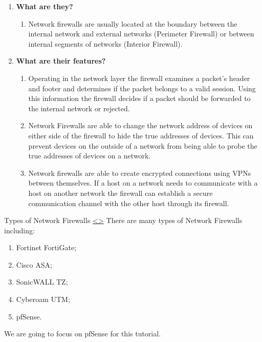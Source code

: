 \documentclass[12pt]{extarticle}
\newenvironment{instructionblock}{\Large\bgroup}{\egroup}
\newcommand{\ben}{\begin{enumerate}}
\newcommand{\een}{\end{enumerate}}
\begin{document}
\vspace{8mm}
\ben

\item \textbf{What are they?}
\begin{enumerate}
\item Network firewalls are usually located at the boundary between the internal network and external networks (Perimeter Firewall) or between internal segments of networks (Interior Firewall).
\end{enumerate}
\item \textbf{What are their features?}
\begin{enumerate}
\item Operating in the network layer the firewall examines a packet's header and footer and determines if the packet belongs to a valid session. Using this information the firewall decides if a packet should be forwarded to the internal network or rejected.\cite{Zen2017PacketInsp}
\item Network Firewalls are able to change the network address of devices on either side of the firewall to hide the true addresses of devices. This can prevent devices on the outside of a network from being able to probe the true addresses of devices on a network.\cite{UnivHOU2016Firewalls}
\item Network firewalls are able to create encrypted connections using VPNs between themselves. If a host on a network needs to communicate with a host on another network the firewall can establish a secure communication channel with the other host through its firewall.
\end{enumerate}

\een







\pagebreak
\begin{slide}{ Types of Network Firewalls }{ \hyperref[slide 5]{\textless}\hyperref[slide 7]{\textgreater} }
\vskip 5pt
\begin{instructionblock}
There are many types of Network Firewalls including: 
\begin{enumerate}
\item Fortinet FortiGate;
\item Cisco ASA;
\item SonicWALL TZ;
\item Cyberoam UTM;
\item pfSense.
\end{enumerate}
We are going to focus on pfSense for this tutorial.
\end{instructionblock}
\end{slide}
\end{document}
